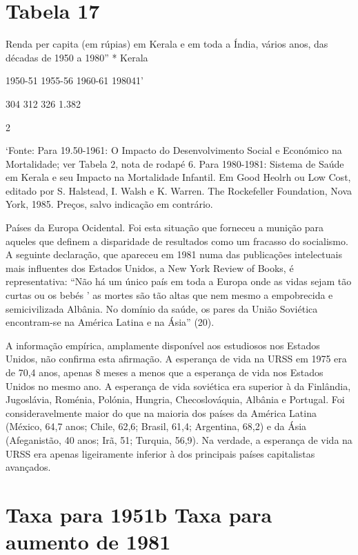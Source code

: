 {{{\section{Tabela 17}
 \par 
Renda per capita (em rúpias) em Kerala e em toda a Índia, vários anos, das décadas de 1950 a 1980'' * Kerala
 \par 
1950-51 1955-56 1960-61 198041'
 \par 
304 {\color{blue}312} 326 {\color{blue}1}.{\color{blue}382}
 \par 
2%
 \par 
‘Fonte: Para {\color{blue}19}.50-1961: O Impacto do Desenvolvimento Social e Económico na Mortalidade; ver Tabela 2, nota de rodapé {\color{blue}6}. Para 1980-1981: Sistema de Saúde em Kerala e seu Impacto na Mortalidade Infantil. Em Good Heolrh ou Low Cost, editado por S. Halstead, I. Walsh e K. Warren. The Rockefeller Foundation, Nova York, 1985. Preços, salvo indicação em contrário.
 \par 
 \par 
Países da Europa Ocidental. Foi esta situação que forneceu a munição para aqueles que definem a disparidade de resultados como um fracasso do socialismo. A seguinte declaração, que apareceu em 1981 numa das publicações intelectuais mais influentes dos Estados Unidos, a New York Review of Books, é representativa: “Não há um único país em toda a Europa onde as vidas sejam tão curtas ou os bebés ' as mortes são tão altas que nem mesmo a empobrecida e semicivilizada Albânia. No domínio da saúde, os pares da União Soviética encontram-se na América Latina e na Ásia” (20).
 \par 
A informação empírica, amplamente disponível aos estudiosos nos Estados Unidos, não confirma esta afirmação. A esperança de vida na URSS em 1975 era de 70,4 anos, apenas {\color{blue}8} meses a menos que a esperança de vida nos Estados Unidos no mesmo ano. A esperança de vida soviética era superior à da Finlândia, Jugoslávia, Roménia, Polónia, Hungria, Checoslováquia, Albânia e Portugal. Foi consideravelmente maior do que na maioria dos países da América Latina (México, 64,7 anos; Chile, 62,6; Brasil, 61,4; Argentina, 68,2) e da Ásia (Afeganistão, {\color{blue}40} anos; Irã, 51; Turquia, 56,9). Na verdade, a esperança de vida na URSS era apenas ligeiramente inferior à dos principais países capitalistas avançados.
 \par 
\section{Taxa para 1951b Taxa para aumento de 1981}
 \par 
}}}
